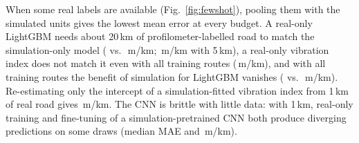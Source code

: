 When some real labels are available (Fig.~\ref{fig:fewshot}), pooling them with the simulated units gives the lowest mean error at every budget.
A real-only LightGBM needs about 20\,km of profilometer-labelled road to match the simulation-only model (\fsRealGbmTwenty{} vs.\ \fsSimOnlyGbmZero\,m/km; \fsRealGbmFive\,m/km with 5\,km), a real-only vibration index does not match it even with all training routes (\fsRealPhysAll\,m/km), and with all training routes the benefit of simulation for LightGBM vanishes (\fsRealGbmAll{} vs.\ \fsSimRealGbmAll\,m/km).
Re-estimating only the intercept of a simulation-fitted vibration index from 1\,km of real road gives \fsSimPhysIntOne\,m/km.
The CNN is brittle with little data: with 1\,km, real-only training and fine-tuning of a simulation-pretrained CNN both produce diverging predictions on some draws (median MAE \fsRealCnnOneMed{} and \fsFtCnnOneMed\,m/km).

